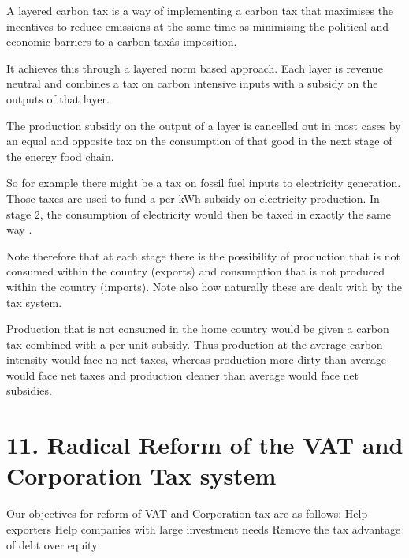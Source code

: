\documentclass[]{tufte-handout}
\begin{document}
A layered carbon tax is a way of implementing a carbon tax that
maximises the incentives to reduce emissions at the same time as
minimising the political and economic barriers to a carbon taxâs
imposition.

It achieves this through a layered norm based approach. Each layer is
revenue neutral and combines a tax on carbon intensive inputs with a
subsidy on the outputs of that layer.

The production subsidy on the output of a layer is cancelled out in most
cases by an equal and opposite tax on the consumption of that good in
the next stage of the energy food chain.

So for example there might be a tax on fossil fuel inputs to electricity
generation. Those taxes are used to fund a per kWh subsidy on
electricity production. In stage 2, the consumption of electricity would
then be taxed in exactly the same way .

Note therefore that at each stage there is the possibility of production
that is not consumed within the country (exports) and consumption that
is not produced within the country (imports). Note also how naturally
these are dealt with by the tax system.

Production that is not consumed in the home country would be given a
carbon tax combined with a per unit subsidy. Thus production at the
average carbon intensity would face no net taxes, whereas production
more dirty than average would face net taxes and production cleaner than
average would face net subsidies. \newpage

\hypertarget{radical-reform-of-the-vat-and-corporation-tax-system}{%
\section{11. Radical Reform of the VAT and Corporation Tax
system}\label{radical-reform-of-the-vat-and-corporation-tax-system}}

Our objectives for reform of VAT and Corporation tax are as follows:
Help exporters Help companies with large investment needs Remove the tax
advantage of debt over equity
\end{document}

